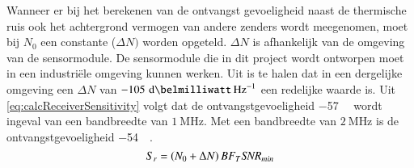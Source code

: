 Wanneer er  bij het berekenen van de ontvangst gevoeligheid naast de thermische ruis ook het achtergrond vermogen van andere zenders wordt meegenomen, moet bij $N_0$ een constante ($\Delta N)$ worden opgeteld. $\Delta N$ is afhankelijk van de omgeving van de sensormodule. De sensormodule die in dit project wordt ontworpen moet in een industriële omgeving kunnen werken. Uit \cite{kumar2020spectrum} is te halen dat in een dergelijke omgeving een $\Delta N$ van $-105\,\,\si{\deci\belmilliwatt\,\hertz^{-1}}$ een redelijke waarde is. Uit \cref{eq:calcReceiverSensitivity} volgt dat de ontvangstgevoeligheid \qty{-57}{\deci\belmilliwatt} wordt ingeval van een bandbreedte van $\SI{1}{\mega\hertz}$. Met een bandbreedte van $\SI{2}{\mega\hertz}$ is de ontvangstgevoeligheid \qty{-54}{\deci\belmilliwatt}.
\begin{equation}\label{eq:calcReceiverSensitivity}
    S_r=\left(N_0+\Delta N\right)BF_T \SNR_{min}
    \tagaddtext{[\si{\deci\belmilliwatt}]}
\end{equation}

